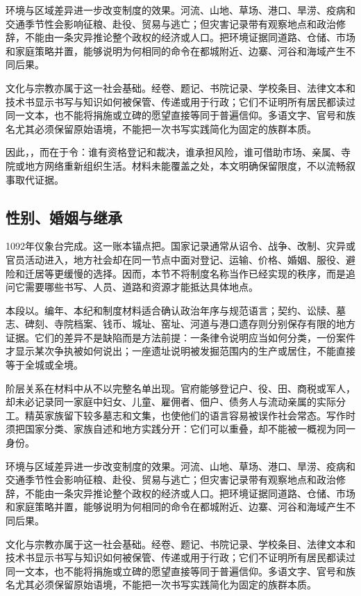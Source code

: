 环境与区域差异进一步改变制度的效果。河流、山地、草场、港口、旱涝、疫病和交通季节性会影响征粮、赴役、贸易与逃亡；但灾害记录带有观察地点和政治修辞，不能由一条灾异推论整个政权的经济或人口。把环境证据同道路、仓储、市场和家庭策略并置，能够说明为何相同的命令在都城附近、边寨、河谷和海域产生不同后果。

文化与宗教亦属于这一社会基础。经卷、题记、书院记录、学校条目、法律文本和技术书显示书写与知识如何被保管、传递或用于行政；它们不证明所有居民都读过同一文本，也不能将捐施或立碑的愿望直接等同于普遍信仰。多语文字、官号和族名尤其必须保留原始语境，不能把一次书写实践简化为固定的族群本质。

因此，，而在于令：谁有资格登记和裁决，谁承担风险，谁可借助市场、亲属、寺院或地方网络重新组织生活。材料未能覆盖之处，本文明确保留限度，不以流畅叙事取代证据。

\subsection{性别、婚姻与继承}

1092年仪象台完成。这一账本锚点把。国家记录通常从诏令、战争、改制、灾异或官员活动进入，地方社会却在同一节点中面对登记、运输、价格、婚姻、服役、避险和迁居等更缓慢的选择。因而，本节不将制度名称当作已经实现的秩序，而是追问它需要哪些书写、人员、道路和资源才能抵达具体地点。

本段以。编年、本纪和制度材料适合确认政治年序与规范语言；契约、讼牍、墓志、碑刻、寺院档案、钱币、城址、窑址、河道与港口遗存则分别保存有限的地方证据。它们的差异不是缺陷而是方法前提：一条律令说明应当如何分类，一份案件才显示某次争执被如何说出；一座遗址说明被发掘范围内的生产或居住，不能直接等于全城或全境。

阶层关系在材料中从不以完整名单出现。官府能够登记户、役、田、商税或军人，却未必记录同一家庭中妇女、儿童、雇佣者、佃户、债务人与流动亲属的实际分工。精英家族留下较多墓志和文集，也使他们的语言容易被误作社会常态。写作时须把国家分类、家族自述和地方实践分开：它们可以重叠，却不能被一概视为同一身份。

环境与区域差异进一步改变制度的效果。河流、山地、草场、港口、旱涝、疫病和交通季节性会影响征粮、赴役、贸易与逃亡；但灾害记录带有观察地点和政治修辞，不能由一条灾异推论整个政权的经济或人口。把环境证据同道路、仓储、市场和家庭策略并置，能够说明为何相同的命令在都城附近、边寨、河谷和海域产生不同后果。

文化与宗教亦属于这一社会基础。经卷、题记、书院记录、学校条目、法律文本和技术书显示书写与知识如何被保管、传递或用于行政；它们不证明所有居民都读过同一文本，也不能将捐施或立碑的愿望直接等同于普遍信仰。多语文字、官号和族名尤其必须保留原始语境，不能把一次书写实践简化为固定的族群本质。

